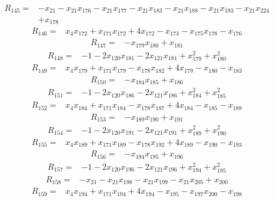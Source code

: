 \[\begin{aligned}R_{145}={}&-x_{21}-x_{21}x_{176}-x_{21}x_{177}-x_{21}x_{183}-x_{21}x_{188}-x_{21}x_{193}-x_{21}x_{224}
\\&+x_{178}
\end{aligned}\]
\[\begin{aligned}R_{146}={}&x_{4}x_{172}+x_{171}x_{172}+4x_{172}-x_{173}-x_{175}x_{178}-x_{176}
\end{aligned}\]
\[\begin{aligned}R_{147}={}&-x_{179}x_{180}+x_{181}
\end{aligned}\]
\[\begin{aligned}R_{148}={}&-1-2x_{120}x_{181}-2x_{121}x_{181}+x_{179}^{2}+x_{180}^{2}
\end{aligned}\]
\[\begin{aligned}R_{149}={}&x_{4}x_{179}+x_{171}x_{179}-x_{178}x_{182}+4x_{179}-x_{180}-x_{183}
\end{aligned}\]
\[\begin{aligned}R_{150}={}&-x_{184}x_{185}+x_{186}
\end{aligned}\]
\[\begin{aligned}R_{151}={}&-1-2x_{120}x_{186}-2x_{121}x_{186}+x_{184}^{2}+x_{185}^{2}
\end{aligned}\]
\[\begin{aligned}R_{152}={}&x_{4}x_{184}+x_{171}x_{184}-x_{178}x_{187}+4x_{184}-x_{185}-x_{188}
\end{aligned}\]
\[\begin{aligned}R_{153}={}&-x_{189}x_{190}+x_{191}
\end{aligned}\]
\[\begin{aligned}R_{154}={}&-1-2x_{120}x_{191}-2x_{121}x_{191}+x_{189}^{2}+x_{190}^{2}
\end{aligned}\]
\[\begin{aligned}R_{155}={}&x_{4}x_{189}+x_{171}x_{189}-x_{178}x_{192}+4x_{189}-x_{190}-x_{193}
\end{aligned}\]
\[\begin{aligned}R_{156}={}&-x_{194}x_{195}+x_{196}
\end{aligned}\]
\[\begin{aligned}R_{157}={}&-1-2x_{120}x_{196}-2x_{121}x_{196}+x_{194}^{2}+x_{195}^{2}
\end{aligned}\]
\[\begin{aligned}R_{158}={}&-x_{21}-x_{21}x_{198}-x_{21}x_{199}-x_{21}x_{205}+x_{200}
\end{aligned}\]
\[\begin{aligned}R_{159}={}&x_{4}x_{194}+x_{171}x_{194}+4x_{194}-x_{195}-x_{197}x_{200}-x_{198}
\end{aligned}\]
